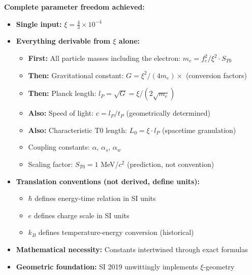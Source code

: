 	\begin{keyresult}
		\textbf{Complete parameter freedom achieved:}
		\begin{itemize}
			\item \textbf{Single input:} $\xi = \frac{4}{3} \times 10^{-4}$
			
			\item \textbf{Everything derivable from $\xi$ alone:}
			\begin{itemize}
				\item \textbf{First:} All particle masses including the electron: $m_e = f_e^2/\xi^2 \cdot S_{T0}$
				\item \textbf{Then:} Gravitational constant: $G = \xi^2/(4m_e) \times$ (conversion factors)
				\item \textbf{Then:} Planck length: $l_P = \sqrt{G} = \xi/(2\sqrt{m_e})$
				\item \textbf{Also:} Speed of light: $c = l_P/t_P$ (geometrically determined)
				\item \textbf{Also:} Characteristic T0 length: $L_0 = \xi \cdot l_P$ (spacetime granulation)
				\item Coupling constants: $\alpha$, $\alpha_s$, $\alpha_w$
				\item Scaling factor: $S_{T0} = 1$ MeV/$c^2$ (prediction, not convention)
			\end{itemize}
			
			\item \textbf{Translation conventions (not derived, define units):}
			\begin{itemize}
				\item $\hbar$ defines energy-time relation in SI units
				\item $e$ defines charge scale in SI units
				\item $k_B$ defines temperature-energy conversion (historical)
			\end{itemize}
			
			\item \textbf{Mathematical necessity:} Constants intertwined through exact formulas
			
			\item \textbf{Geometric foundation:} SI 2019 unwittingly implements $\xi$-geometry
		\end{itemize}
	\end{keyresult}
	
